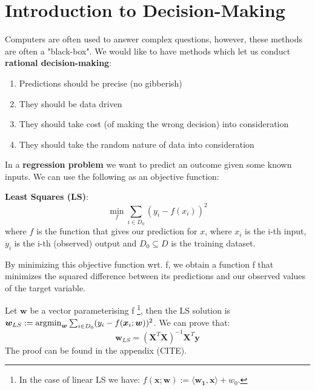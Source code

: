 \section{Introduction to Decision-Making}

Computers are often used to answer complex questions, however, these methods are often a "black-box". We would like to have methods which let us conduct \textbf{rational decision-making}:
\begin{enumerate}
    \item Predictions should be precise (no gibberish)
    \item They should be data driven
    \item They should take cost (of making the wrong decision) into consideration
    \item They should take the random nature of data into consideration
\end{enumerate}

In a \textbf{regression problem} we want to predict an outcome given some known inputs. We can use the following as an objective function:
\begin{definition}
    \textbf{Least Squares (LS)}: \\
    \begin{equation}
        \min_{f} \sum_{i \in D_{0}}  (y_{i} - f(x_{i}))  ^{2}
    \end{equation}
    where $f$ is the function that gives our prediction for $x$, where $x_{i}$ is the i-th input, $y_{i}$ is the i-th (observed) output and $D_{0} \subseteq D$ is the training dataset.
\end{definition}
By minimizing this objective function wrt. f, we obtain a function f that minimizes the squared difference between its predictions and our observed values of the target variable.

Let $\bm{w}$ be a vector parameterising f \footnote{In the case of linear LS we have: $f(\bm{x};\bm{w}) := \langle \bm{w_{1}} ,\bm{x} \rangle + w_{0}$.}, then the LS solution is $\bm{w}_{LS} := \operatorname*{arg\!\min}_{\bm{w}} \sum_{i \in D_{0}} (y_{i}-f(\bm{x}_{i}; \bm{w}))^{2}$. We can prove that:
\begin{equation}\label{eqn:wLS solution}
    \bm{w}_{LS} = (\bm{X}^{T} \bm{X})^{-1} \bm{X}^{T} \bm{y} 
\end{equation}
The proof can be found in the appendix (CITE). 

